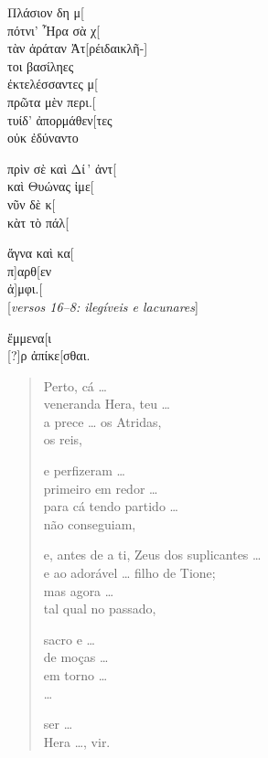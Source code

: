 \begin{gkverse}
Πλάσιον δη μ[\\
πότνι’ Ἦρα σὰ χ[\\
τὰν ἀράταν Ἀτ[ρέιδαι\qquad        κλῆ-]\\
τοι βασίληες\\

ἐκτελέσσαντες μ[\\
πρῶτα μὲν περι.[\\
τυίδ’ ἀπορμάθεν[τες\\
οὐκ ἐδύναντο

πρὶν σὲ καὶ Δί\,’ ἀντ[\\
καὶ Θυώνας ἰμε[\\
νῦν δὲ κ[\\
κὰτ τὸ πάλ[

ἄγνα καὶ κα[\\
π]αρθ[εν\\
ἀ]μφι.[\\

\textnormal{[\emph{versos 16--8: ilegíveis e lacunares}]}

ἔμμενα[ι\\
{[}?{]}ρ ἀπίκε[σθαι.
\end{gkverse}


\begin{verse}
Perto, cá \ldots{}\\
veneranda Hera, teu \ldots{}\\
a prece \ldots{} os Atridas,\\
os reis,

e perfizeram \ldots{}\\
primeiro em redor \ldots{}\\
para cá tendo partido \ldots{}\\
não conseguiam,

e, antes de a ti, Zeus dos suplicantes \ldots{}\\
e ao adorável \ldots{} filho de Tione;\\
mas agora \ldots{}\\
tal qual no passado,

sacro e \ldots{}\\
de moças \ldots{}\\
em torno \ldots{}\\
\ldots{}

ser \ldots{}\\
Hera \ldots{}, vir.
\end{verse}

\medskip

